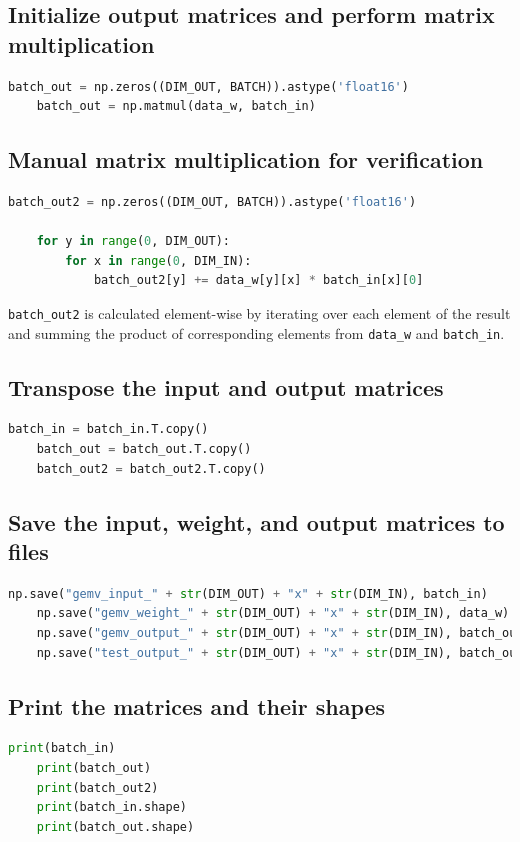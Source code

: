 \documentclass[12pt]{article}
\begin{document}
\subsection{Initialize output matrices and perform matrix multiplication}
\begin{lstlisting}[language=Python]
	batch_out = np.zeros((DIM_OUT, BATCH)).astype('float16')
	batch_out = np.matmul(data_w, batch_in)
\end{lstlisting}

\subsection{Manual matrix multiplication for verification}
\begin{lstlisting}[language=Python]
	batch_out2 = np.zeros((DIM_OUT, BATCH)).astype('float16')
	
	for y in range(0, DIM_OUT):
		for x in range(0, DIM_IN):
			batch_out2[y] += data_w[y][x] * batch_in[x][0]
\end{lstlisting}
\texttt{batch\_out2} is calculated element-wise by iterating over each element of the result and summing the product of corresponding elements from \texttt{data\_w} and \texttt{batch\_in}.

\subsection{Transpose the input and output matrices}
\begin{lstlisting}[language=Python]
	batch_in = batch_in.T.copy()
	batch_out = batch_out.T.copy()
	batch_out2 = batch_out2.T.copy()
\end{lstlisting}

\subsection{Save the input, weight, and output matrices to files}
\begin{lstlisting}[language=Python]
	np.save("gemv_input_" + str(DIM_OUT) + "x" + str(DIM_IN), batch_in)
	np.save("gemv_weight_" + str(DIM_OUT) + "x" + str(DIM_IN), data_w)
	np.save("gemv_output_" + str(DIM_OUT) + "x" + str(DIM_IN), batch_out)
	np.save("test_output_" + str(DIM_OUT) + "x" + str(DIM_IN), batch_out2)
\end{lstlisting}

\subsection{Print the matrices and their shapes}
\begin{lstlisting}[language=Python]
	print(batch_in)
	print(batch_out)
	print(batch_out2)
	print(batch_in.shape)
	print(batch_out.shape)
\end{lstlisting}
\end{document}
